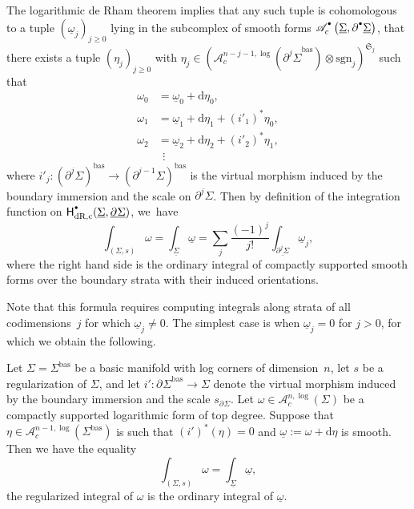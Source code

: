 \documentclass[JEP,XML,SOM,Unicode,NoFloatCountersInSection,published]{cedram}
\let\oldbullet\bullet
\renewcommand{\bullet}{{\raisebox{1pt}{$\scriptscriptstyle\oldbullet$}}}
\theoremstyle{definition}
\theoremstyle{remark}
\renewcommand{\ge}{\geqslant}
\newcommand{\uomega}{\underline{\omega}}
\newcommand{\rbrac}[1]{\left(#1\right)}
\newcommand{\dd}{\mathrm{d}}
\newcommand{\Ac}[2][\bullet]{\mathscr{A}_c^{#1}\rbrac{#2}}
\newcommand{\Alogc}[2][\bullet]{\mathscr{A}^{#1,\log}_c(#2)}
\newcommand{\Sig}{\Sigma}
\newcommand{\uSig}{\underline{\Sigma}}
\newcommand{\bas}[1]{{#1}^{\mathrm{bas}}}
\newcommand{\Sigbas}{\bas{\Sig}}
\newcommand{\ubdSig}[1][]{\underline{\partial^{#1}\Sigma}}
\newcommand{\bdSig}[1][]{\partial^{#1}\Sigma}
\newcommand{\HdRc}[2][\bullet]{\mathsf{H}_{\mathrm{dR},\mathrm{c}}^{#1}(#2)}
\newcommand{\symgp}[1]{\mathfrak{S}_{#1}}
\newcommand{\sgn}[1]{\mathrm{sgn}_{#1}}
\begin{document}
The logarithmic de Rham theorem implies that any such tuple is cohomologous to a tuple $(\uomega_j)_{j \ge0}$ lying in the subcomplex of smooth forms $\Ac{\uSig,\partial^\bullet\uSig}$, \ie that there exists a tuple $(\eta_j)_{j \ge 0}$ with $\eta_j \in (\Alogc[n-j-1]{\bas{\bdSig[j]}}\otimes \sgn{j})^{\symgp{j}}$ such that
\begin{align*}
\omega_0 &= \uomega_0 + \dd \eta_0, \\
\omega_1 &= \uomega_1 + \dd \eta_1 + (i'_1)^*\eta_0, \\
\omega_2 &= \uomega_2 + \dd \eta_2 + (i'_2)^*\eta_1, \\
&\ \ \vdots
\end{align*}
where $i'_j : \bas{(\bdSig[j])} \to \bas{(\bdSig[j-1])}$ is the virtual morphism induced by the boundary immersion and the scale on $\bdSig[j]$. Then by definition of the integration function on $\HdRc{\uSig,\ubdSig}$, we~have
\[
\int_{(\Sig,s)} \omega = \int_{\uSig} \uomega = \sum_j \frac{(-1)^j}{j!} \int_{\ubdSig[j]} \uomega_j,
\]
where the right hand side is the ordinary integral of compactly supported smooth forms over the boundary strata with their induced orientations.

Note that this formula requires computing integrals along strata of all codimensions~$j$ for which $\uomega_j \neq 0$. The simplest case is when $\uomega_j =0$ for $j >0$, for which we obtain the following.

\begin{proposition}\label{lem:how-to-compute-regularized-integral}
Let $\Sig = \Sigbas$ be a basic manifold with log corners of dimension~$n$, let $s$ be a regularization of $\Sig$, and let $i' : \bas{\bdSig} \to \Sig$ denote the virtual morphism induced by the boundary immersion and the scale $s_{\bdSig}$. Let $\omega \in \Alogc[n]{\Sig}$ be a compactly supported logarithmic form of top degree. Suppose that $\eta\in \Alogc[n-1]{\Sigbas}$ is such that $(i')^*(\eta)=0$ and $\uomega := \omega + \dd \eta$ is smooth. Then we have the equality
\[
\int_{(\Sig,s)}\omega = \int_{\uSig}\underline{\omega},
\]
\ie the regularized integral of $\omega$ is the ordinary integral of $\uomega$.
\end{proposition}
\end{document}

